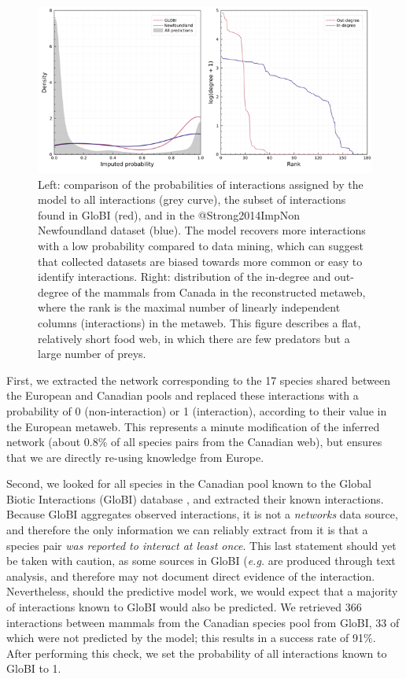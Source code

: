 \begin{figure}[h]
    \centering
    \includegraphics[width=\textwidth]{figures/figure-validation.png}
    \caption{Left: comparison of the probabilities of interactions assigned
by the model to all interactions (grey curve), the subset of
interactions found in GloBI (red), and in the @Strong2014ImpNon
Newfoundland dataset (blue). The model recovers more interactions with a
low probability compared to data mining, which can suggest that
collected datasets are biased towards more common or easy to identify
interactions. Right: distribution of the in-degree and out-degree of the
mammals from Canada in the reconstructed metaweb, where the rank is the
maximal number of linearly independent columns (interactions) in the
metaweb. This figure describes a flat, relatively short food web, in
which there are few predators but a large number of
preys.}
    \label{fig:inflation}
\end{figure}

First, we extracted the network corresponding to the 17 species shared
between the European and Canadian pools and replaced these interactions
with a probability of 0 (non-interaction) or 1 (interaction), according
to their value in the European metaweb. This represents a minute
modification of the inferred network (about 0.8\% of all species pairs
from the Canadian web), but ensures that we are directly re-using
knowledge from Europe.

Second, we looked for all species in the Canadian pool known to the
Global Biotic Interactions (GloBI) database \cite{Poelen2014GloBio}, and
extracted their known interactions. Because GloBI aggregates observed
interactions, it is not a \emph{networks} data source, and therefore the
only information we can reliably extract from it is that a species pair
\emph{was reported to interact at least once}. This last statement
should yet be taken with caution, as some sources in GloBI (\emph{e.g.}
\cite{Thessen2014KnoExt} are produced through text analysis, and therefore
may not document direct evidence of the interaction. Nevertheless,
should the predictive model work, we would expect that a majority of
interactions known to GloBI would also be predicted. We retrieved 366
interactions between mammals from the Canadian species pool from GloBI,
33 of which were not predicted by the model; this results in a success
rate of 91\%. After performing this check, we set the probability of all
interactions known to GloBI to 1.

